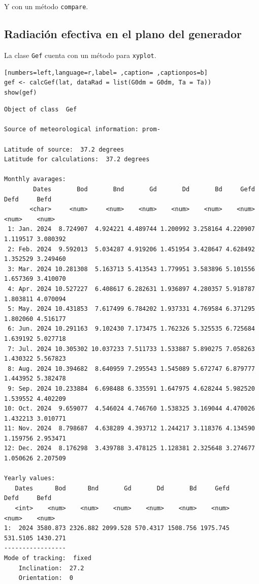 Y con un método \texttt{compare}.


\subsection{Radiación efectiva en el plano del generador}
\label{sec:org4ba908d}
La clase \texttt{Gef} cuenta con un método para \texttt{xyplot}.
\begin{lstlisting}[numbers=left,language=r,label= ,caption= ,captionpos=b]
gef <- calcGef(lat, dataRad = list(G0dm = G0dm, Ta = Ta))
show(gef)
\end{lstlisting}

\begin{verbatim}
Object of class  Gef 

Source of meteorological information: prom- 

Latitude of source:  37.2 degrees
Latitude for calculations:  37.2 degrees

Monthly avarages:
        Dates       Bod       Bnd       Gd       Dd       Bd     Gefd     Defd     Befd
       <char>     <num>     <num>    <num>    <num>    <num>    <num>    <num>    <num>
 1: Jan. 2024  8.724907  4.924221 4.489744 1.200992 3.258164 4.220907 1.119517 3.080392
 2: Feb. 2024  9.592013  5.034287 4.919206 1.451954 3.428647 4.628492 1.352529 3.249460
 3: Mar. 2024 10.281308  5.163713 5.413543 1.779951 3.583896 5.101556 1.657369 3.410070
 4: Apr. 2024 10.527227  6.408617 6.282631 1.936897 4.280357 5.918787 1.803811 4.070094
 5: May. 2024 10.431853  7.617499 6.784202 1.937331 4.769584 6.371295 1.802060 4.516177
 6: Jun. 2024 10.291163  9.102430 7.173475 1.762326 5.325535 6.725684 1.639192 5.027718
 7: Jul. 2024 10.305302 10.037233 7.511733 1.533887 5.890275 7.058263 1.430322 5.567823
 8: Aug. 2024 10.394682  8.640959 7.295543 1.545089 5.672747 6.879777 1.443952 5.382478
 9: Sep. 2024 10.233884  6.698488 6.335591 1.647975 4.628244 5.982520 1.539552 4.402209
10: Oct. 2024  9.659077  4.546024 4.746760 1.538325 3.169044 4.470026 1.432213 3.010771
11: Nov. 2024  8.798687  4.638289 4.393712 1.244217 3.118376 4.134590 1.159756 2.953471
12: Dec. 2024  8.176298  3.439788 3.478125 1.128381 2.325648 3.274677 1.050626 2.207509

Yearly values:
   Dates      Bod      Bnd       Gd       Dd       Bd     Gefd     Defd     Befd
   <int>    <num>    <num>    <num>    <num>    <num>    <num>    <num>    <num>
1:  2024 3580.873 2326.882 2099.528 570.4317 1508.756 1975.745 531.5105 1430.271
-----------------
Mode of tracking:  fixed 
    Inclination:  27.2 
    Orientation:  0
\end{verbatim}

